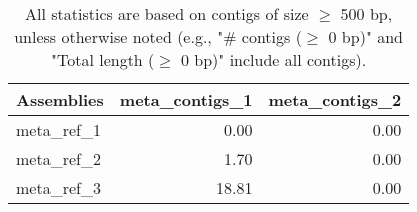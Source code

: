 \documentclass[12pt,a4paper]{article}
\begin{document}
\begin{table}[ht]
\begin{center}
\caption{All statistics are based on contigs of size $\geq$ 500 bp, unless otherwise noted (e.g., "\# contigs ($\geq$ 0 bp)" and "Total length ($\geq$ 0 bp)" include all contigs).}
\begin{tabular}{|l*{2}{|r}|}
\hline
Assemblies & meta\_contigs\_1 & meta\_contigs\_2 \\ \hline
meta\_ref\_1 & 0.00 & 0.00 \\ \hline
meta\_ref\_2 & 1.70 & 0.00 \\ \hline
meta\_ref\_3 & 18.81 & 0.00 \\ \hline
\end{tabular}
\end{center}
\end{table}
\end{document}
